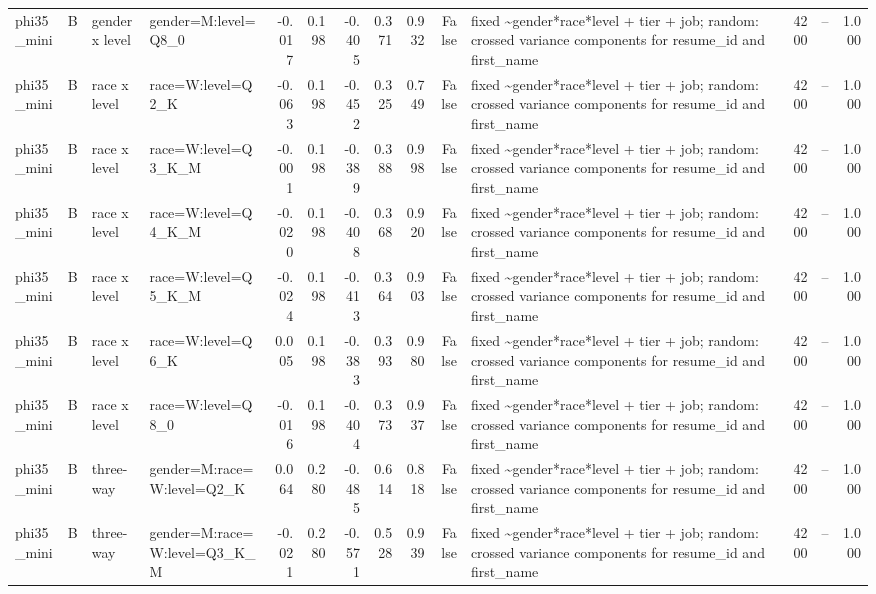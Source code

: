 \begin{tabular}{llllrrrrrrlrlr}
phi35\_mini & B & gender x level & gender=M:level=Q8\_0 & -0.017 & 0.198 & -0.405 & 0.371 & 0.932 & False & fixed \textasciitilde \space gender*race*level + tier + job; random: crossed variance components for resume\_id and first\_name & 4200 & -- & 1.000 \\
phi35\_mini & B & race x level & race=W:level=Q2\_K & -0.063 & 0.198 & -0.452 & 0.325 & 0.749 & False & fixed \textasciitilde \space gender*race*level + tier + job; random: crossed variance components for resume\_id and first\_name & 4200 & -- & 1.000 \\
phi35\_mini & B & race x level & race=W:level=Q3\_K\_M & -0.001 & 0.198 & -0.389 & 0.388 & 0.998 & False & fixed \textasciitilde \space gender*race*level + tier + job; random: crossed variance components for resume\_id and first\_name & 4200 & -- & 1.000 \\
phi35\_mini & B & race x level & race=W:level=Q4\_K\_M & -0.020 & 0.198 & -0.408 & 0.368 & 0.920 & False & fixed \textasciitilde \space gender*race*level + tier + job; random: crossed variance components for resume\_id and first\_name & 4200 & -- & 1.000 \\
phi35\_mini & B & race x level & race=W:level=Q5\_K\_M & -0.024 & 0.198 & -0.413 & 0.364 & 0.903 & False & fixed \textasciitilde \space gender*race*level + tier + job; random: crossed variance components for resume\_id and first\_name & 4200 & -- & 1.000 \\
phi35\_mini & B & race x level & race=W:level=Q6\_K & 0.005 & 0.198 & -0.383 & 0.393 & 0.980 & False & fixed \textasciitilde \space gender*race*level + tier + job; random: crossed variance components for resume\_id and first\_name & 4200 & -- & 1.000 \\
phi35\_mini & B & race x level & race=W:level=Q8\_0 & -0.016 & 0.198 & -0.404 & 0.373 & 0.937 & False & fixed \textasciitilde \space gender*race*level + tier + job; random: crossed variance components for resume\_id and first\_name & 4200 & -- & 1.000 \\
phi35\_mini & B & three-way & gender=M:race=W:level=Q2\_K & 0.064 & 0.280 & -0.485 & 0.614 & 0.818 & False & fixed \textasciitilde \space gender*race*level + tier + job; random: crossed variance components for resume\_id and first\_name & 4200 & -- & 1.000 \\
phi35\_mini & B & three-way & gender=M:race=W:level=Q3\_K\_M & -0.021 & 0.280 & -0.571 & 0.528 & 0.939 & False & fixed \textasciitilde \space gender*race*level + tier + job; random: crossed variance components for resume\_id and first\_name & 4200 & -- & 1.000 \\

\end{tabular}
